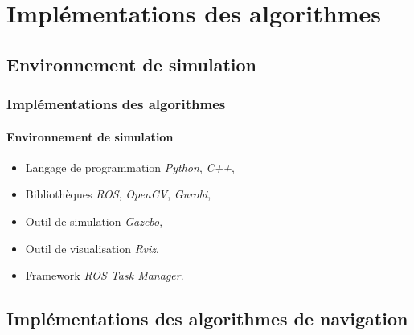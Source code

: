 \documentclass{beamer}
\begin{document}
	\section{Implémentations des algorithmes}
		\subsection{Environnement de simulation}
			\begin{frame}
				\frametitle{Implémentations des algorithmes}
				\framesubtitle{Environnement de simulation}
				\begin{itemize}
					\item Langage de programmation \textit{Python}, \textit{C++},
					\item Bibliothèques \textit{ROS}, \textit{OpenCV}, \textit{Gurobi},
					\item Outil de simulation \textit{Gazebo},
					\item Outil de visualisation \textit{Rviz},
					\item Framework \textit{ROS Task Manager}.
				\end{itemize}
			\end{frame}
		\subsection{Implémentations des algorithmes de navigation}
\end{document}

